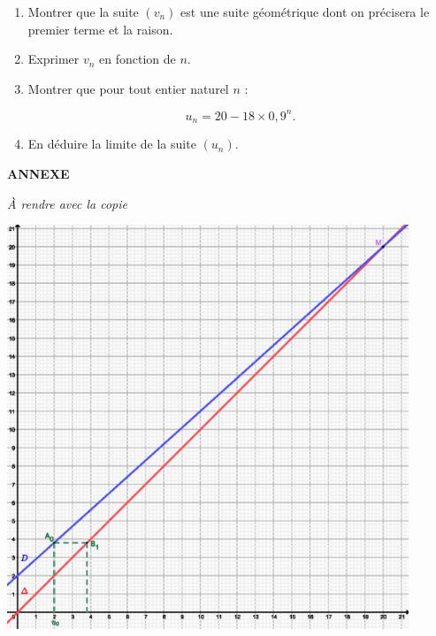 \par
\begin{enumerate}
     \item
     Montrer que la suite $(v_n)$ est une suite géométrique dont on précisera le premier terme et la raison.
     \item
     Exprimer $v_n$ en fonction de $n$.
     \item
     Montrer que pour tout entier naturel $n$ :
     \par
     \[ u_n=20-18 \times 0,9^n. \]
     \item
     En déduire la limite de la suite $(u_n)$.
     \par
\end{enumerate}
\newpage
\begin{center}
     \textbf{ANNEXE}
\end{center}
\begin{center}
     \emph{\`A rendre avec la copie}
\end{center}
\vspace{0.1\paperheight}
\begin{center}
     \begin{extern}%
          \includegraphics[width=0.9\textwidth]{images/BBESL-s3-2-1.eps}%
     \end{extern}
\end{center}
\newpage
